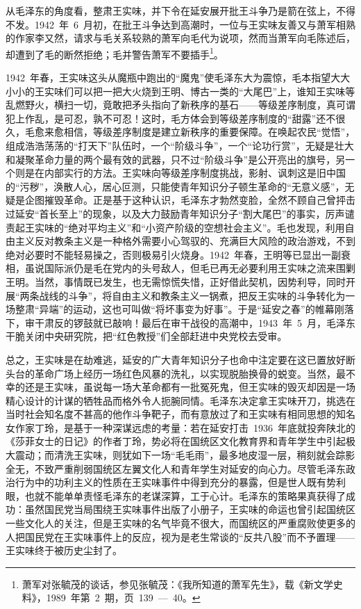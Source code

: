 从毛泽东的角度看，整肃王实味，并下令在延安展开批王斗争乃是箭在弦上，不得不发。1942~年~6~月初，在批王斗争达到高潮时，一位与王实味友善又与萧军相熟的作家李又然，请求与毛关系较熟的萧军向毛代为说项，然而当萧军向毛陈述后，却遭到了毛的断然拒绝；毛并警告萧军不要插手\footnote{萧军对张毓茂的谈话，参见张毓茂：《我所知道的萧军先生》，载《新文学史料》，1989~年第~2~期，页~139~—~40。}。

1942~年春，王实味这头从魔瓶中跑出的“魔鬼”使毛泽东大为震惊，毛本指望大大小小的王实味们可以把一把大火烧到王明、博古一类的“大尾巴”上，谁知王实味等乱燃野火，横扫一切，竟敢把矛头指向了新秩序的基石——等级差序制度，真可谓犯上作乱，是可忍，孰不可忍！这时，毛方体会到等级差序制度的“甜露”还不很久，毛愈来愈相信，等级差序制度是建立新秩序的重要保障。在唤起农民“觉悟”，组成浩浩荡荡的“打天下”队伍时，一个“阶级斗争”，一个“论功行赏”，无疑是壮大和凝聚革命力量的两个最有效的武器，只不过“阶级斗争”是公开亮出的旗号，另一个则是在内部实行的方法。王实味向等级差序制度挑战，影射、讽刺这是旧中国的“污秽”，涣散人心，居心叵测，只能使青年知识分子顿生革命的“无意义感”，无疑是企图摧毁革命。正是基于这种认识，毛泽东才勃然变脸，全然不顾自己曾抨击过延安“首长至上”的现象，以及大力鼓励青年知识分子“割大尾巴”的事实，厉声谴责起王实味的“绝对平均主义”和“小资产阶级的空想社会主义”。毛也发现，利用自由主义反对教条主义是一种格外需要小心驾驭的、充满巨大风险的政治游戏，不到绝对必要时不能轻易操之，否则极易引火烧身。1942~年春，王明等已显出一副衰相，虽说国际派仍是毛在党内的头号敌人，但毛已再无必要利用王实味之流来围剿王明。当然，事情既已发生，也无需惊慌失惜，正好借此契机，因势利导，同时开展“两条战线的斗争”，将自由主义和教条主义一锅煮，把反王实味的斗争转化为一场整肃“异端”的运动，这也可叫做“将坏事变为好事”。于是“延安之春”的帷幕刚落下，审干肃反的锣鼓就已敲响！最后在审干战役的高潮中，1943~年~5~月，毛泽东干脆关闭中央研究院，把“红色教授”们全部赶进中央党校去受审。

总之，王实味是在劫难逃，延安的广大青年知识分子也命中注定要在这已置放好断头台的革命广场上经历一场红色风暴的洗礼，以实现脱胎换骨的蜕变。当然，最不幸的还是王实味，虽说每一场大革命都有一批冤死鬼，但王实味的毁灭却因是一场精心设计的计谋的牺牲品而格外令人扼腕同情。毛泽东决定拿王实味开刀，挑选在当时社会知名度不甚高的他作斗争靶子，而有意放过了和王实味有相同思想的知名女作家丁玲，是基于一种深谋远虑的考量：若在延安打击~1936~年底就投奔陕北的《莎菲女士的日记》的作者丁玲，势必将在国统区文化教育界和青年学生中引起极大震动；而清洗王实味，则犹如下一场“毛毛雨”，最多地皮湿一层，稍刻就会踪影全无，不致严重削弱国统区左翼文化人和青年学生对延安的向心力。尽管毛泽东政治行为中的功利主义的性质在王实味事件中得到充分的暴露，但是世人既有势利眼，也就不能单单责怪毛泽东的老谋深算，工于心计。毛泽东的策略果真获得了成功：虽然国民党当局围绕王实味事件出版了小册子，王实味的命运也曾引起国统区一些文化人的关注，但是王实味的名气毕竟不很大，而国统区的严重腐败使更多的人把国民党在王实味事件上的反应，视为是老生常谈的“反共八股”而不予置理——王实味终于被历史尘封了。

